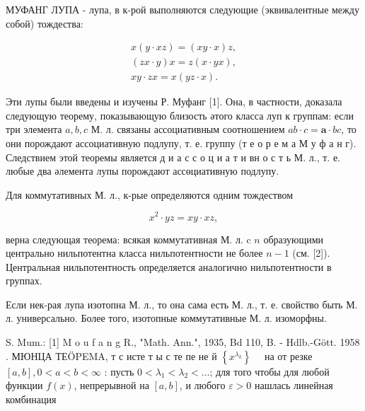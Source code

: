 \documentclass[10pt]{article}
\begin{document}
МУФАНГ ЛУПА - лупа, в к-рой выполняются следующие (эквивалентные между собой) тождества:



\[

\begin{gathered}

x(y \cdot x z)=(x y \cdot x) z, \\

(z x \cdot y) x=z(x \cdot y x), \\

x y \cdot z x=x(y z \cdot x) .

\end{gathered}

\]



Эти лупы были введены и изучены Р. Муфанг [1]. Она, в частности, доказала следующую теорему, показывающую близость әтого класса луп к группам: если три элемента $a, b, c$ М. л. связаны ассоциативным соотношением $a b \cdot c=\boldsymbol{a} \cdot b c$, то они порождают ассоциативную подлупу, т. е. группу (т е о р е м а М у ф а н г). Следствием этой теоремы является д и а с с о ц и а т и вн о с т ь М. л., т. е. любые два әлемента лупы порождают ассөциативную подлупу.



Для коммутативных М. л., к-рые определяются одним тождеством



\[

x^{2} \cdot y z=x y \cdot x z,

\]



верна следующая теорема: всякая коммутативная М. л. c $n$ образующими центрально нильпотентна класса нильпотентности не более $n-1$ (см. [2]). Центральная нильпотентность определяется аналогично нильпотентности в группах.



Если нек-рая лупа изотопна М. л., то она сама есть М. л., т. е. свойство быть М. л. универсально. Более того, изотопные коммутативные М. л. изоморфны.



S. Mum.: [1] M o u f a n g R., "Math. Ann.", 1935, Bd 110, B. - Hdlb.-Gött. 1958 . МЮНЦА ТЕÖPEMA, т с исте т ы с те пе не й $\left\{x^{\lambda_{k}}\right\} \quad$ на от резке $[a, b], 0<a<b<\infty$ : пусть $0<\lambda_{1}<\lambda_{2}<\ldots$; для того чтобы для любой функции $f(x)$, непрерывной на $[a, b]$, и любого $\varepsilon>0$ нашлась линейная комбинация
\end{document}
